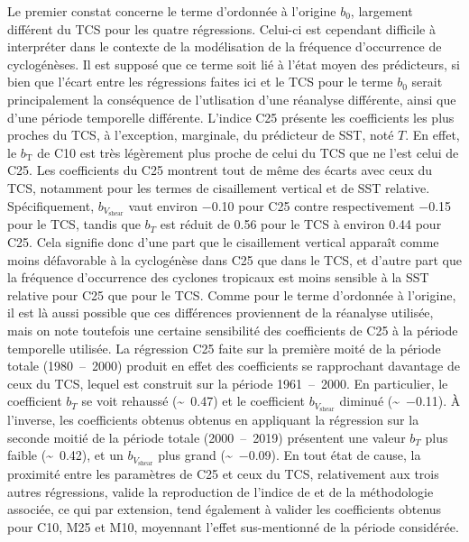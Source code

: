 \documentclass[../main.tex]{subfiles}
\begin{document}
Le premier constat concerne le terme d'ordonnée à l'origine $b_0$, largement différent du TCS pour les quatre régressions. Celui-ci est cependant difficile à
interpréter dans le contexte de la modélisation de la fréquence d'occurrence de cyclogénèses. Il est supposé que ce terme soit lié à l'état moyen des
prédicteurs, si bien que l'écart entre les régressions faites ici et le TCS pour le terme $b_0$ serait principalement la conséquence de l'utlisation d'une
réanalyse différente, ainsi que d'une période temporelle différente. L'indice C25 présente les coefficients les plus proches du TCS, à l'exception, marginale,
du prédicteur de SST, noté $T$. En effet, le $b_{\mathrm{T}}$ de C10 est très légèrement plus proche de celui du TCS que ne l'est celui de C25. Les coefficients
du C25 montrent tout de même des écarts avec ceux du TCS, notamment pour les termes de cisaillement vertical et de SST relative. Spécifiquement,
$b_{V_{\mathrm{shear}}}$ vaut environ \num{-0.10} pour C25 contre respectivement \num{-0.15} pour le TCS, tandis que $b_T$ est réduit de \num{0.56} pour le TCS
à environ \num{0.44} pour C25. Cela signifie donc d'une part que le cisaillement vertical apparaît comme moins défavorable à la cyclogénèse dans C25 que dans le
TCS, et d'autre part que la fréquence d'occurrence des cyclones tropicaux est moins sensible à la SST relative pour C25 que pour le TCS. Comme pour le terme
d'ordonnée à l'origine, il est là aussi possible que ces différences proviennent de la réanalyse utilisée, mais on note toutefois une certaine sensibilité des
coefficients de C25 à la période temporelle utilisée. La régression C25 faite sur la première moité de la période totale (\num{1980}~--~\num{2000}) produit en
effet des coefficients se rapprochant davantage de ceux du TCS, lequel est construit sur la période \num{1961}~--~\num{2000}. En particulier, le coefficient
$b_T$ se voit rehaussé (\sim~\num{0.47}) et le coefficient $b_{V_{\mathrm{shear}}}$ diminué (\sim~\num{-0.11}). À l'inverse, les coefficients obtenus obtenus en
appliquant la régression sur la seconde moitié de la période totale (\num{2000}~--~\num{2019}) présentent une valeur $b_T$ plus faible (\sim~\num{0.42}), et un
$b_{V_{\mathrm{shear}}}$ plus grand (\sim~\num{-0.09}). En tout état de cause, la proximité entre les paramètres de C25 et ceux du TCS, relativement aux trois
autres régressions, valide la reproduction de l'indice de \textcite{tippett_poisson_2011} et de la méthodologie associée, ce qui par extension, tend également à
valider les coefficients obtenus pour C10, M25 et M10, moyennant l'effet sus-mentionné de la période considérée.
\end{document}
